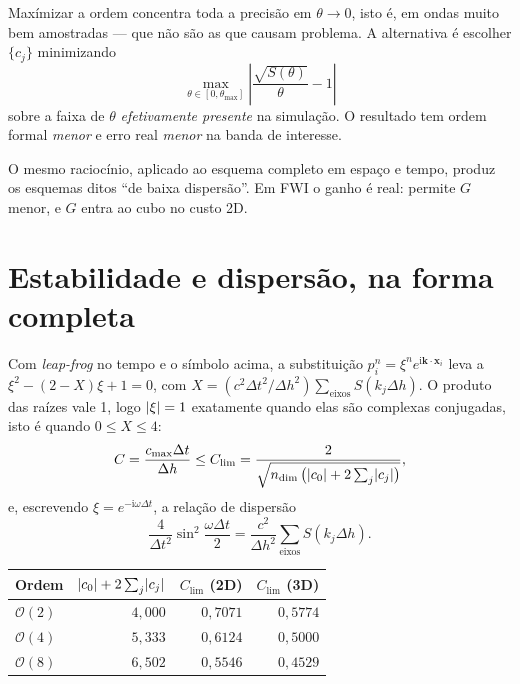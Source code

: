 \documentclass[11pt,a4paper,oneside]{report}
\begin{document}
\begin{teoria}
Max\'imizar a ordem concentra toda a precis\~ao em $\theta \to 0$, isto \'e,
em ondas muito bem amostradas --- que n\~ao s\~ao as que causam problema. A
alternativa \'e escolher $\{c_j\}$ minimizando
\[
\max_{\theta\in[0,\theta_{\max}]}
\left|\frac{\sqrt{S(\theta)}}{\theta} - 1\right|
\]
sobre a faixa de $\theta$ \emph{efetivamente presente} na simula\c{c}\~ao.
O resultado tem ordem formal \emph{menor} e erro real \emph{menor} na banda
de interesse.

O mesmo racioc\'inio, aplicado ao esquema completo em espa\c{c}o e tempo,
produz os esquemas ditos ``de baixa dispers\~ao''. Em FWI o ganho \'e real:
permite $G$ menor, e $G$ entra ao cubo no custo 2D.
\end{teoria}

\section{Estabilidade e dispers\~ao, na forma completa}

Com \emph{leap-frog} no tempo e o s\'imbolo acima, a substitui\c{c}\~ao
$p_i^{n} = \xi^{n}e^{\mathrm{i}\mathbf{k}\cdot\mathbf{x}_i}$ leva a
$\xi^{2}-(2-X)\xi+1 = 0$, com
$X = (c^{2}\Delta t^{2}/\Delta h^{2})\sum_{\text{eixos}} S(k_j\Delta h)$.
O produto das ra\'izes vale 1, logo $\lvert \xi \rvert=1$ exatamente quando elas s\~ao
complexas conjugadas, isto \'e quando $0\le X\le 4$:
\begin{equation}
C = \frac{c_{\max}\Delta t}{\Delta h} \le C_{\lim}
 = \frac{2}{\sqrt{n_{\dim}\,\bigl(\lvert c_0 \rvert+2\sum_j\lvert c_j \rvert\bigr)}},
\label{eq:cfl3}
\end{equation}
e, escrevendo $\xi = e^{-\mathrm{i}\omega\Delta t}$, a rela\c{c}\~ao de
dispers\~ao
\begin{equation}
\frac{4}{\Delta t^{2}}\sin^{2}\!\frac{\omega\Delta t}{2}
 = \frac{c^{2}}{\Delta h^{2}}\sum_{\text{eixos}} S(k_j\Delta h).
\label{eq:disp3}
\end{equation}

\begin{center}
\begin{tabular}{@{}lrrr@{}}
\toprule
\textbf{Ordem} & $\lvert c_0 \rvert+2\sum_j\lvert c_j \rvert$ & $C_{\lim}$ (2D) & $C_{\lim}$ (3D) \\
\midrule
$\mathcal{O}(2)$ & $4{,}000$ & $0{,}7071$ & $0{,}5774$ \\
$\mathcal{O}(4)$ & $5{,}333$ & $0{,}6124$ & $0{,}5000$ \\
$\mathcal{O}(8)$ & $6{,}502$ & $0{,}5546$ & $0{,}4529$ \\
\bottomrule
\end{tabular}
\end{center}
\end{document}
